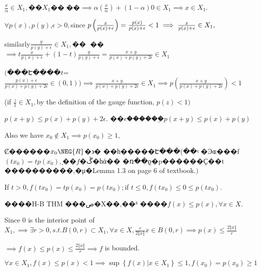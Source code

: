 \documentclass{article}
\begin{document}
\begin{CJK}{GBK}{song}
$\frac{x}{\alpha }\in X_{1},$��$X_{1}$��͹��$%
\implies \alpha \left( \frac{x}{\alpha }\right) +\left( 1-\alpha \right)
0\in X_{1}\implies x\in X_{1}.$

$\forall p\left( x\right) ,p\left( y\right) $,$\epsilon >0,$since $p\left( 
\frac{x}{p\left( x\right) +\epsilon }\right) =\frac{p\left( x\right) }{%
p\left( x\right) +\epsilon }<1\implies \frac{x}{p\left( x\right) +\epsilon }%
\in X_{1},$

similarly$\frac{y}{p\left( y\right) +\epsilon }\in X_{1},$��͹%
��$\implies t\frac{x}{p\left( x\right) +\epsilon }+\left( 1-t\right) 
\frac{y}{p\left( y\right) +\epsilon }=\frac{x+y}{p\left( x\right) +p\left(
y\right) +2\epsilon }\in X_{1}$

$($���Է����$t$=$\frac{p\left( x\right)
+\epsilon }{p\left( x\right) +p\left( y\right) +2\epsilon }\in \left(
0,1\right) )\implies \frac{x+y}{p\left( x\right) +p\left( y\right)
+2\epsilon }\in X_{1}\implies p\left( \frac{x+y}{p\left( x\right) +p\left(
y\right) +2\epsilon }\right) <1$

(if $\frac{z}{1}\in X_{1},$by the definition of the gauge function, $p\left(
z\right) <1)$

$p\left( x+y\right) \leq p\left( x\right) +p\left( y\right) +2\epsilon .$%
��$\epsilon $������֪$p\left( x+y\right) \leq
p\left( x\right) +p\left( y\right) $

Also we have $x_{0}\notin X_{1}\implies p\left( x_{0}\right) \geq 1,$

\bigskip Ȼ������$x_{0}\NEG{R}$�϶�%
��һ�����Է���(��ʵ%
�Ͽɶ���f$\left( tx_{0}\right) =tp\left(
x_{0}\right) ,$֤��$f$�ڴ�һά��%
�ռ��ϱ�p������Ҫ��t%
����������,�μ�Lemma 1.3 on page 6
of textbook.$)$

If $t>0,f\left( tx_{0}\right) =tp\left( x_{0}\right) =p\left( tx_{0}\right)
; $if $t\leq 0,f\left( tx_{0}\right) \leq 0\leq p\left( tx_{0}\right) .$

����H-B THM ���ص�X��,��ʱ%
����$f(x)\leq p\left( x\right) ,\forall x\in X$.

Since $0$ is the interior point of $X_{1},\implies \exists r>0,s.t.B\left(
0,r\right) \subset X_{1},\forall x\in X,\frac{r}{2\left\Vert x\right\Vert }%
x\in B\left( 0,r\right) \implies p\left( x\right) \leq \frac{2\left\Vert
x\right\Vert }{r}$

$\implies f\left( x\right) \leq p\left( x\right) \leq \frac{2\left\Vert
x\right\Vert }{r}\implies f$ is bounded.

\bigskip $\forall x\in X_{1},f\left( x\right) \leq p\left( x\right)
<1\implies \sup \left\{ f\left( x\right) |x\in X_{1}\right\} \leq 1,f\left(
x_{0}\right) =p\left( x_{0}\right) \geq 1$


\end{CJK}
\end{document}
